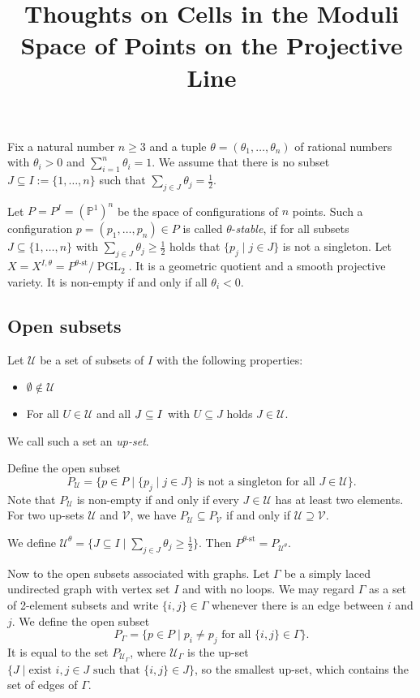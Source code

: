 \documentclass[11pt, a4paper]{amsart}
\title{Thoughts on Cells in the Moduli Space of Points on the Projective Line}
\author{}
\date{}
\begin{document}
	\maketitle
	
	Fix a natural number \(n \geq 3\) and a tuple \(\theta = (\theta_1,\ldots,\theta_n)\) of rational numbers with \(\theta_i > 0\) and \(\sum_{i=1}^n \theta_i = 1\). 
	We assume that there is no subset \(J \subseteq I := \{1,\ldots,n\}\) such that \(\sum_{j \in J} \theta_j = \frac{1}{2}\).

	Let \(P = P^I = {(\mathbb{P}^1)}^n\) be the space of configurations of \(n\) points. 
	Such a configuration \(p = (p_1,\ldots,p_n) \in P\) is called \(\theta\)-\emph{stable}, if for all subsets \(J \subseteq \{1,\ldots,n\}\) with \(\sum_{j \in J} \theta_j \geq \frac{1}{2}\) holds that \(\{p_j \mid j \in J\}\) is not a singleton.
	Let \(X = X^{I,\theta} = P^{\theta\text{-st}}/\operatorname{PGL}_2\). It is a geometric quotient and a smooth projective variety. 
	It is non-empty if and only if all \(\theta_i < 0\).

	\subsection*{Open subsets}
	Let \(\mathcal{U}\) be a set of subsets of \(I\) with the following properties:
	\begin{itemize}
		\item \(\emptyset \notin \mathcal{U}\)
		\item For all \(U \in \mathcal{U}\) and all \(J \subseteq I\) with \(U \subseteq J\) holds \(J \in \mathcal{U}\).
	\end{itemize}
	We call such a set an \emph{up-set}.

	Define the open subset 
	\[ 
		P_\mathcal{U} = \{p \in P \mid \{p_j \mid j \in J\} \text{ is not a singleton for all } J \in \mathcal{U} \}.
	\]
	Note that \(P_{\mathcal{U}}\) is non-empty if and only if every \(J \in \mathcal{U}\) has at least two elements. 
	For two up-sets \(\mathcal{U}\) and \(\mathcal{V}\), we have \(P_{\mathcal{U}} \subseteq P_{\mathcal{V}}\) if and only if \(\mathcal{U} \supseteq \mathcal{V}\).

	We define \(\mathcal{U}^\theta = \{J \subseteq I \mid \sum_{j \in J} \theta_j \geq \frac{1}{2} \}\). 
	Then \(P^{\theta\text{-st}} = P_{\mathcal{U}^\theta}\).

	Now to the open subsets associated with graphs. Let \(\Gamma\) be a simply laced undirected graph with vertex set \(I\) and with no loops.
	We may regard \(\Gamma\) as a set of 2-element subsets and write \(\{i,j\} \in \Gamma\) whenever there is an edge between \(i\) and \(j\). 
	We define the open subset 
	\[
		P_\Gamma = \{p \in P \mid p_i \neq p_j \text{ for all } \{i,j\} \in \Gamma \}.
	\]
	It is equal to the set \(P_{\mathcal{U}_\Gamma}\), where \(\mathcal{U}_\Gamma\) is the up-set \(\{J \mid \text{exist } i,j \in J \text{ such that } \{i,j\} \in J\}\), so the smallest up-set, which contains the set of edges of \(\Gamma\).
\end{document}
